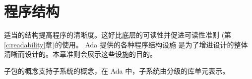 %
%
%

\chapter{程序结构}

适当的结构提高程序的清晰度。这好比底层的可读性并促进可读性准则
 (第\ref{c:readability}章)的使用。 Ada 提供的各种程序结构设施
是为了增进设计的整体清晰而设计的。本章准则会展示这些设施的目的。

子包的概念支持子系统的概念，在 Ada 中，子系统由分级的库单元表示。



